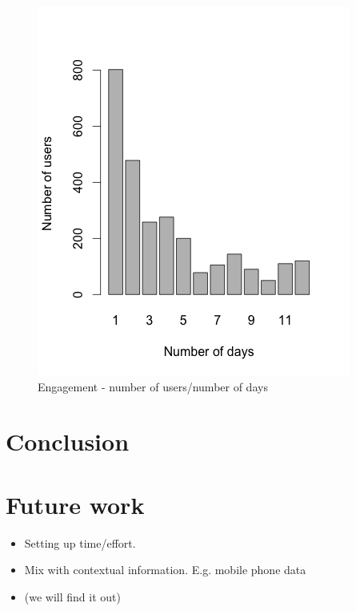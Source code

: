 \documentclass{article}
\begin{document}
\begin{figure}[t]
  \begin{center}
		\includegraphics[width=\columnwidth]{imgs/Engagement2.png}
  \end{center}
\caption{Engagement - number of users/number of days}
\label{img:Engagement-days}
\end{figure}











\section{Conclusion}


\section{Future work}

\begin{itemize}
\item Setting up time/effort. 
\item Mix with contextual information. E.g. mobile phone data 
\item (we will find it out)
\end{itemize}





\end{document}

